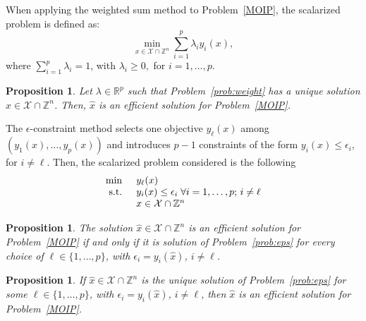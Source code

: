 \documentclass[preprint,12pt]{elsarticle}
\newtheorem{proposition}[theorem]{Proposition}
\def\R{\mathbb{R}}
\def\Z{\mathbb{Z}}
\begin{document}
When applying the weighted sum method to Problem~\eqref{MOIP}, the scalarized problem is defined as:
 \begin{equation}\label{prob:weight}
  \min_{x\in \mathcal{X}\cap \Z^n} \sum_{i=1}^p \lambda_i y_i(x),
 \end{equation}
 where $\sum_{i=1}^p \lambda_i = 1$, with  $\lambda_i\geq 0,$\; for $i=1,\ldots,p$.
\begin{proposition}\label{prop:weight}
 Let $\lambda \in \R^p$ such that Problem~\eqref{prob:weight} has a unique solution $\hat x \in \mathcal{X}\cap \Z^n$. Then, $\hat x$ is an efficient solution
 for Problem~\eqref{MOIP}.
\end{proposition}
The $\epsilon$-constraint method selects one objective $y_{\ell}(x)$ among $(y_1(x),\ldots,y_p(x))$ and introduces $p-1$ constraints of the form $y_i(x)\leq \epsilon_i$, for $i\neq \ell$.
Then, the scalarized problem considered is the following
\begin{equation}\label{prob:eps}
\begin{array}{l l}
    \min & y_{\ell}(x)\\
    \textnormal{ s.t. }& y_i(x)\leq \epsilon_i \; \forall i=1,\ldots,p;\, i\neq \ell\\
    & x\in \mathcal{X}\cap \Z^n
  \end{array}
 \end{equation}
\begin{proposition}\label{prop:eps}
 The solution $\hat x\in \mathcal{X}\cap \Z^n$ is an efficient solution for Problem~\eqref{MOIP} if and only if
 it is solution of Problem~\eqref{prob:eps} for every choice of $\ell\in \{1,\ldots,p\}$, with $\epsilon_i = y_i(\hat x)$, $i\neq \ell$.
\end{proposition}

\begin{proposition}\label{prop:eps2}
 If $\hat x\in \mathcal{X}\cap \Z^n$ is the unique solution of Problem~\eqref{prob:eps} for some $\ell\in \{1,\ldots,p\}$, with $\epsilon_i = y_i(\hat x)$, $i\neq \ell$,
 then $\hat x$ is an efficient solution for Problem~\eqref{MOIP}.
\end{proposition}
\end{document}
